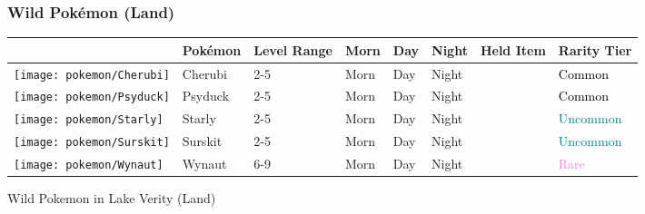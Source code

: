 \subsubsection{Wild Pokémon (Land)}%
\label{ssubsec:WildPokmon(Land)}%
\begin{longtable}{||l l l l l l l l||}%
\hline%
&Pokémon&Level Range&Morn&Day&Night&Held Item&Rarity Tier\\%
\hline%
\endhead%
\hline%
\texttt{[image: pokemon/Cherubi]}&Cherubi&2{-}5&Morn&Day&Night&&\textcolor{black}{%
Common%
}\\%
\hline%
\texttt{[image: pokemon/Psyduck]}&Psyduck&2{-}5&Morn&Day&Night&&\textcolor{black}{%
Common%
}\\%
\hline%
\texttt{[image: pokemon/Starly]}&Starly&2{-}5&Morn&Day&Night&&\textcolor{teal}{%
Uncommon%
}\\%
\hline%
\texttt{[image: pokemon/Surskit]}&Surskit&2{-}5&Morn&Day&Night&&\textcolor{teal}{%
Uncommon%
}\\%
\hline%
\texttt{[image: pokemon/Wynaut]}&Wynaut&6{-}9&Morn&Day&Night&&\textcolor{violet}{%
Rare%
}\\%
\hline%
\end{longtable}%
\caption{Wild Pokemon in Lake Verity (Land)}